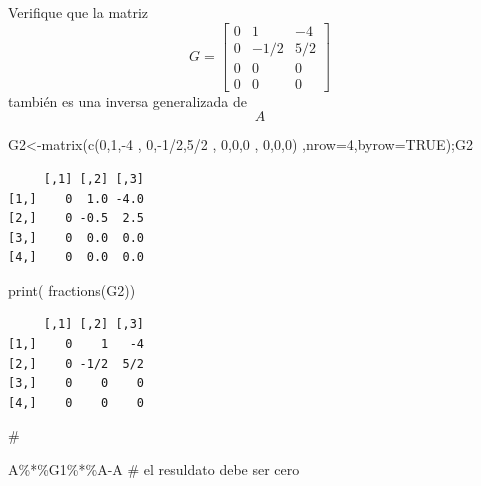 \documentclass[
  ignorenonframetext,
  aspectratio=169,
  spanish,
]{beamer}
\newenvironment{Shaded}{\begin{snugshade}}{\end{snugshade}}
\newcommand{\AttributeTok}[1]{\textcolor[rgb]{0.40,0.45,0.13}{#1}}
\newcommand{\CommentTok}[1]{\textcolor[rgb]{0.37,0.37,0.37}{#1}}
\newcommand{\ConstantTok}[1]{\textcolor[rgb]{0.56,0.35,0.01}{#1}}
\newcommand{\DecValTok}[1]{\textcolor[rgb]{0.68,0.00,0.00}{#1}}
\newcommand{\FunctionTok}[1]{\textcolor[rgb]{0.28,0.35,0.67}{#1}}
\newcommand{\NormalTok}[1]{\textcolor[rgb]{0.00,0.23,0.31}{#1}}
\newcommand{\OtherTok}[1]{\textcolor[rgb]{0.00,0.23,0.31}{#1}}
\newcommand{\SpecialCharTok}[1]{\textcolor[rgb]{0.37,0.37,0.37}{#1}}
\begin{document}
\begin{frame}[fragile]{}
\label{section-2}
Verifique que la matriz \[ G=\begin{bmatrix}
0 & 1 & -4\\
0 & -1/2 & 5/2\\
0 & 0  & 0 \\
0 & 0  & 0 
\end{bmatrix} \] también es una inversa generalizada de \[A\]

\begin{Shaded}
\begin{Highlighting}[]
\NormalTok{G2}\OtherTok{\textless{}{-}}\FunctionTok{matrix}\NormalTok{(}\FunctionTok{c}\NormalTok{(}\DecValTok{0}\NormalTok{,}\DecValTok{1}\NormalTok{,}\SpecialCharTok{{-}}\DecValTok{4}\NormalTok{ ,}
    \DecValTok{0}\NormalTok{,}\SpecialCharTok{{-}}\DecValTok{1}\SpecialCharTok{/}\DecValTok{2}\NormalTok{,}\DecValTok{5}\SpecialCharTok{/}\DecValTok{2}\NormalTok{ ,}
    \DecValTok{0}\NormalTok{,}\DecValTok{0}\NormalTok{,}\DecValTok{0}\NormalTok{ ,}
    \DecValTok{0}\NormalTok{,}\DecValTok{0}\NormalTok{,}\DecValTok{0}\NormalTok{) ,}\AttributeTok{nrow=}\DecValTok{4}\NormalTok{,}\AttributeTok{byrow=}\ConstantTok{TRUE}\NormalTok{);G2}
\end{Highlighting}
\end{Shaded}

\begin{verbatim}
     [,1] [,2] [,3]
[1,]    0  1.0 -4.0
[2,]    0 -0.5  2.5
[3,]    0  0.0  0.0
[4,]    0  0.0  0.0
\end{verbatim}

\begin{Shaded}
\begin{Highlighting}[]
\FunctionTok{print}\NormalTok{( }\FunctionTok{fractions}\NormalTok{(G2))}
\end{Highlighting}
\end{Shaded}

\begin{verbatim}
     [,1] [,2] [,3]
[1,]    0    1   -4
[2,]    0 -1/2  5/2
[3,]    0    0    0
[4,]    0    0    0
\end{verbatim}

\begin{Shaded}
\begin{Highlighting}[]
\CommentTok{\#}
\end{Highlighting}
\end{Shaded}

\begin{Shaded}
\begin{Highlighting}[]
\NormalTok{A}\SpecialCharTok{\%*\%}\NormalTok{G1}\SpecialCharTok{\%*\%}\NormalTok{A}\SpecialCharTok{{-}}\NormalTok{A }\CommentTok{\# el resuldato debe ser cero}
\end{Highlighting}
\end{Shaded}


\end{frame}
\end{document}
